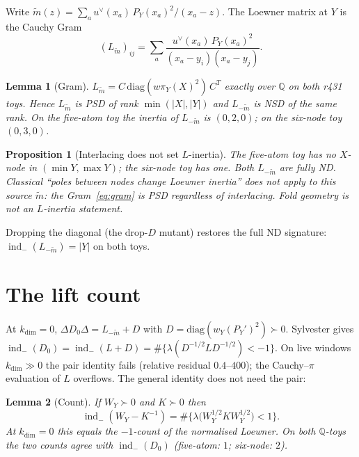\documentclass[11pt]{article}
\newtheorem{lemma}{Lemma}
\newtheorem{prop}{Proposition}
\theoremstyle{remark}
\newcommand{\indm}{\operatorname{ind}_{-}}
\begin{document}
Write $\widetilde{m}(z)=\sum_a u^\vee(x_a)\,P_Y(x_a)^2/(x_a-z)$.
The Loewner matrix at $Y$ is the Cauchy Gram
\begin{equation}\label{eq:gram}
(L_{\widetilde{m}})_{ij}
=\sum_a \frac{u^\vee(x_a)\,P_Y(x_a)^2}{(x_a-y_i)(x_a-y_j)}.
\end{equation}

\begin{lemma}[Gram]\label{lem:gram}
$L_{\widetilde{m}}=C\,\mathrm{diag}(w\pi_Y(X)^2)\,C^T$
exactly over $\mathbb{Q}$ on both r431 toys.
Hence $L_{\widetilde{m}}$ is PSD of rank $\min(|X|,|Y|)$
and $L_{-\widetilde{m}}$ is NSD of the same rank.
On the five-atom toy the inertia of $L_{-\widetilde{m}}$
is $(0,2,0)$; on the six-node toy $(0,3,0)$.
\end{lemma}

\begin{prop}[Interlacing does not set $L$-inertia]\label{prop:interlace}
The five-atom toy has no $X$-node in $(\min Y,\max Y)$;
the six-node toy has one.
Both $L_{-\widetilde{m}}$ are fully ND.
Classical ``poles between nodes change Loewner inertia''
does \emph{not} apply to this source $\widetilde{m}$:
the Gram~\eqref{eq:gram} is PSD regardless of interlacing.
Fold geometry is not an $L$-inertia statement.
\end{prop}

Dropping the diagonal (the drop-$D$ mutant) restores the
full ND signature: $\indm(L_{-\widetilde{m}})=|Y|$ on both
toys.

\section{The lift count}

At $k_{\dim}=0$,
$\Delta D_0\Delta=L_{-\widetilde{m}}+D$ with
$D=\mathrm{diag}(w_Y(P_Y')^2)\succ 0$.
Sylvester gives
$\indm(D_0)=\indm(L+D)=\#\{\lambda(D^{-1/2}LD^{-1/2})<-1\}$.
On live windows $k_{\dim}\gg 0$ the pair identity fails
(relative residual $0.4$--$400$); the Cauchy--$\pi$
evaluation of $L$ overflows.
The general identity does not need the pair:

\begin{lemma}[Count]\label{lem:count}
If $W_Y\succ 0$ and $K\succ 0$ then
\begin{equation}\label{eq:count}
\indm(W_Y-K^{-1})
=\#\bigl\{\lambda\bigl(W_Y^{1/2}KW_Y^{1/2}\bigr)<1\bigr\}.
\end{equation}
At $k_{\dim}=0$ this equals the $-1$-count of the
normalised Loewner.
On both $\mathbb{Q}$-toys the two counts agree with
$\indm(D_0)$ (five-atom: $1$; six-node: $2$).
\end{lemma}
\end{document}
